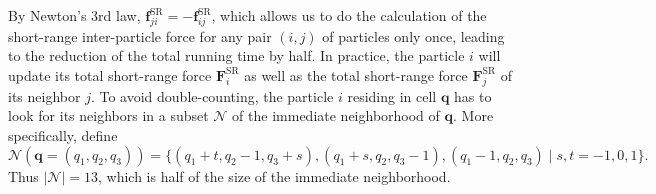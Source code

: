 By Newton's 3rd law, $\mathbf{f}^\text{SR}_{ji} = -\mathbf{f}^\text{SR}_{ij}$, which allows us to do the calculation of the short-range inter-particle force for any pair $(i, j)$ of particles only once, leading to the reduction of the total running time by half.
In practice, the particle $i$ will update its total short-range force $\mathbf{F}^\text{SR}_i$ as well as the total short-range force $\mathbf{F}^\text{SR}_j$ of its neighbor $j$.
To avoid double-counting, the particle $i$ residing in cell $\mathbf{q}$ has to look for its neighbors in a subset $\mathcal{N}$ of the immediate neighborhood of $\mathbf{q}$.
More specifically, define
\begin{equation*}
    \mathcal{N}(\mathbf{q} = (q_1, q_2, q_3)) = \{(q_1+t, q_2-1,q_3+s), (q_1+s, q_2, q_3-1), (q_1-1,q_2,q_3) \;|\; s,t = -1,0,1 \}.
\end{equation*}
Thus $|\mathcal{N}| = 13$, which is half of the size of the immediate neighborhood.

